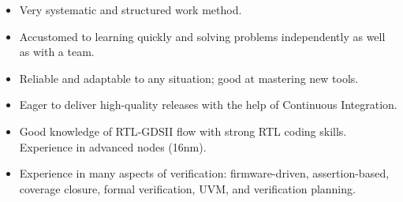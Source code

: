 

\begin{cvparagraph}
  \begin{itemize}[nosep, noitemsep]
    \item {Very systematic and structured work method.}
    \item {Accustomed to learning quickly and solving problems independently as well as with a team.}
    \item {Reliable and adaptable to any situation; good at mastering new tools.}
    \item {Eager to deliver high-quality releases with the help of Continuous Integration.}
    \item {Good knowledge of RTL‑GDSII flow with strong RTL coding skills. Experience in advanced nodes (16nm).}
    \item {Experience in many aspects of verification: firmware-driven, assertion-based, coverage closure, formal verification, UVM, and verification planning.}
  \end{itemize}
\end{cvparagraph}
